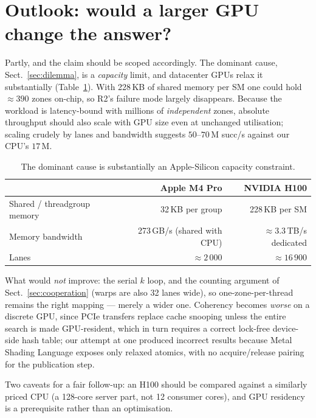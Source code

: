 \section{Outlook: would a larger GPU change the answer?}
\label{sec:h100}

Partly, and the claim should be scoped accordingly. The dominant cause,
Sect.~\ref{sec:dilemma}, is a \emph{capacity} limit, and datacenter GPUs relax it
substantially (Table~\ref{tab:h100}). With 228\,KB of shared memory per SM one could hold
${\approx}390$ zones on-chip, so R2's failure mode largely disappears. Because the workload is
latency-bound with millions of \emph{independent} zones, absolute throughput should also
scale with GPU size even at unchanged utilisation; scaling crudely by lanes and bandwidth
suggests $50$--$70$\,M succ/s against our CPU's $17$\,M.

\begin{table}[t]
\centering
\caption{The dominant cause is substantially an Apple-Silicon capacity constraint.}
\label{tab:h100}
\begin{tabular}{lrr}
\toprule
& Apple M4 Pro & NVIDIA H100 \\
\midrule
Shared / threadgroup memory & 32\,KB per group & 228\,KB per SM \\
Memory bandwidth & 273\,GB/s (shared with CPU) & ${\approx}3.3$\,TB/s dedicated \\
Lanes & ${\approx}2\,000$ & ${\approx}16\,900$ \\
\bottomrule
\end{tabular}
\end{table}

What would \emph{not} improve: the serial $k$ loop, and the counting argument of
Sect.~\ref{sec:cooperation} (warps are also 32 lanes wide), so one-zone-per-thread remains the
right mapping --- merely a wider one. Coherency becomes \emph{worse} on a discrete GPU, since
PCIe transfers replace cache snooping unless the entire search is made GPU-resident, which in
turn requires a correct lock-free device-side hash table; our attempt at one produced
incorrect results because Metal Shading Language exposes only relaxed atomics, with no
acquire/release pairing for the publication step.

Two caveats for a fair follow-up: an H100 should be compared against a similarly priced CPU
(a 128-core server part, not 12 consumer cores), and GPU residency is a prerequisite rather
than an optimisation.
